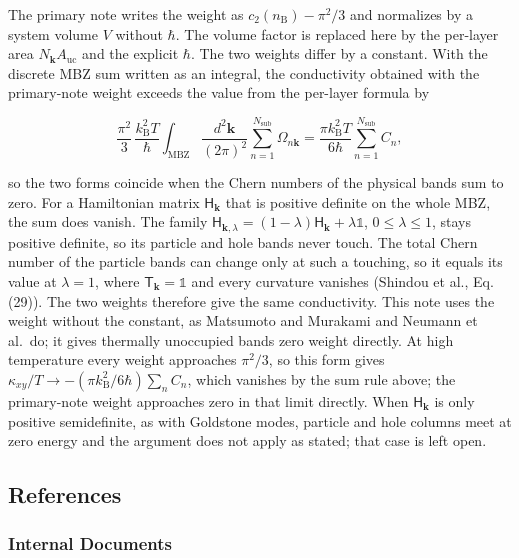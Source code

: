 The primary note writes the weight as \(c_2(n_{\mathrm B})-\pi^2/3\) and normalizes by a system volume \(V\) without \(\hbar\). The volume factor is replaced here by the per-layer area \(N_{\mathbf k}A_{\mathrm{uc}}\) and the explicit \(\hbar\). The two weights differ by a constant. With the discrete MBZ sum written as an integral, the conductivity obtained with the primary-note weight exceeds the value from the per-layer formula by

\[
\frac{\pi^2}{3}\,\frac{k_{\mathrm B}^2T}{\hbar}\int_{\mathrm{MBZ}}\frac{d^2\mathbf k}{(2\pi)^2}\sum_{n=1}^{N_{\mathrm{sub}}}\Omega_{n\mathbf k}
=\frac{\pi k_{\mathrm B}^2T}{6\hbar}\sum_{n=1}^{N_{\mathrm{sub}}}C_n,
\]

so the two forms coincide when the Chern numbers of the physical bands sum to zero. For a Hamiltonian matrix \(\mathsf H_{\mathbf k}\) that is positive definite on the whole MBZ, the sum does vanish. The family \(\mathsf H_{\mathbf k,\lambda}=(1-\lambda)\mathsf H_{\mathbf k}+\lambda\mathbb 1\), \(0\le\lambda\le1\), stays positive definite, so its particle and hole bands never touch. The total Chern number of the particle bands can change only at such a touching, so it equals its value at \(\lambda=1\), where \(\mathsf T_{\mathbf k}=\mathbb 1\) and every curvature vanishes (Shindou et al., Eq. (29)). The two weights therefore give the same conductivity. This note uses the weight without the constant, as Matsumoto and Murakami and Neumann et al.~do; it gives thermally unoccupied bands zero weight directly. At high temperature every weight approaches \(\pi^2/3\), so this form gives \(\kappa_{xy}/T\to-(\pi k_{\mathrm B}^2/6\hbar)\sum_nC_n\), which vanishes by the sum rule above; the primary-note weight approaches zero in that limit directly. When \(\mathsf H_{\mathbf k}\) is only positive semidefinite, as with Goldstone modes, particle and hole columns meet at zero energy and the argument does not apply as stated; that case is left open.

\subsection{References}

\subsubsection{Internal Documents}

